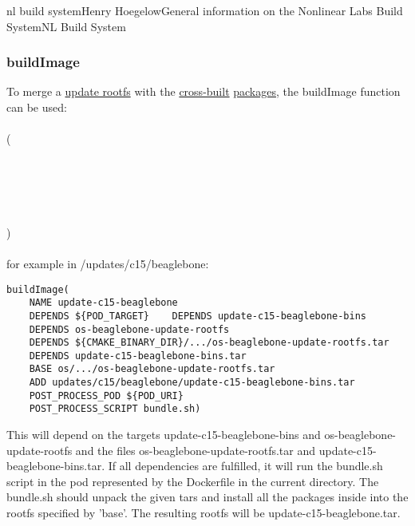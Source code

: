 \documentclass[11pt]{article}
\begin{document}
\begin{Name}{1}{nl build system}{Henry Hoegelow}{General information on the Nonlinear Labs Build System}{NL Build System}
\subsubsection{buildImage}
To merge a \hyperref[os-update]{update rootfs} with the \hyperref[crossbuild]{cross-built} \hyperref[packages]{packages}, the buildImage function can be used:\\
\\
(\\
\indent{}\\
\indent{}\\
\indent{}\\
\indent{}\\
\indent{}\\
\indent{})\\
\\
for example in /updates/c15/beaglebone:

\begin{verbatim}
buildImage(
    NAME update-c15-beaglebone
    DEPENDS ${POD_TARGET}    DEPENDS update-c15-beaglebone-bins
    DEPENDS os-beaglebone-update-rootfs
    DEPENDS ${CMAKE_BINARY_DIR}/.../os-beaglebone-update-rootfs.tar
    DEPENDS update-c15-beaglebone-bins.tar
    BASE os/.../os-beaglebone-update-rootfs.tar
    ADD updates/c15/beaglebone/update-c15-beaglebone-bins.tar
    POST_PROCESS_POD ${POD_URI}
    POST_PROCESS_SCRIPT bundle.sh)
\end{verbatim}
This will depend on the targets update-c15-beaglebone-bins and os-beaglebone-update-rootfs and the files os-beaglebone-update-rootfs.tar and update-c15-beaglebone-bins.tar. If all dependencies are fulfilled, it will run the bundle.sh script in the pod represented by the Dockerfile in the current directory. The bundle.sh should unpack the given tars and install all the packages inside into the rootfs specified by 'base'. The resulting rootfs will be update-c15-beaglebone.tar.

\end{Name}
\end{document}
